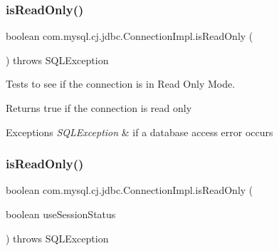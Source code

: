 \mbox{\label{classcom_1_1mysql_1_1cj_1_1jdbc_1_1_connection_impl_a1bd9587a13c01e6f58570c837024cf2d}} 
\subsubsection{\texorpdfstring{is\+Read\+Only()}{isReadOnly()}\hspace{0.1cm}{\footnotesize\ttfamily [1/2]}}
{\footnotesize\ttfamily boolean com.\+mysql.\+cj.\+jdbc.\+Connection\+Impl.\+is\+Read\+Only (\begin{DoxyParamCaption}{ }\end{DoxyParamCaption}) throws S\+Q\+L\+Exception}

Tests to see if the connection is in Read Only Mode.

\begin{DoxyReturn}{Returns}
true if the connection is read only 
\end{DoxyReturn}

\begin{DoxyExceptions}{Exceptions}
{\em S\+Q\+L\+Exception} & if a database access error occurs \\
\hline
\end{DoxyExceptions}
\mbox{\label{classcom_1_1mysql_1_1cj_1_1jdbc_1_1_connection_impl_ab81709d56fbf320b82e513a770342a90}} 
\subsubsection{\texorpdfstring{is\+Read\+Only()}{isReadOnly()}\hspace{0.1cm}{\footnotesize\ttfamily [2/2]}}
{\footnotesize\ttfamily boolean com.\+mysql.\+cj.\+jdbc.\+Connection\+Impl.\+is\+Read\+Only (\begin{DoxyParamCaption}\item[{boolean}]{use\+Session\+Status }\end{DoxyParamCaption}) throws S\+Q\+L\+Exception}

